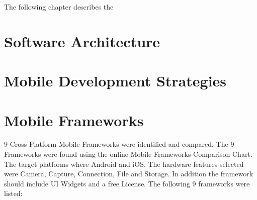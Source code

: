 The following chapter describes the

\section{Software Architecture}


\section{Mobile Development Strategies}


\section{Mobile Frameworks}

9 Cross Platform Mobile Frameworks were identified and compared. The 9 Frameworks were  found using the online Mobile Frameworks Comparison Chart. The target platforms where Android and iOS. The hardware features selected were Camera, Capture, Connection, File and Storage. In addition the framework should include UI Widgets and a free License. The following 9 frameworks were listed:

